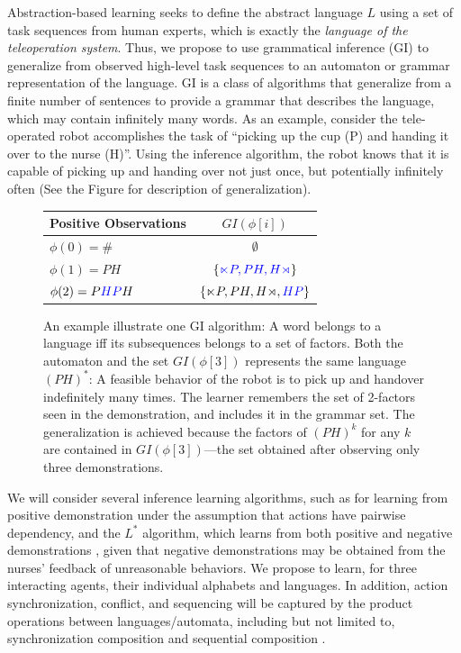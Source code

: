 \documentclass[letterpaper, 11 pt, onecolumn]{article}
\begin{document}
Abstraction-based learning seeks to define the abstract language $L$ using a set of task sequences from human experts, which is exactly the \emph{language of the teleoperation system}. Thus, we propose to use grammatical inference (GI) \cite{de2010grammatical} to generalize from observed  high-level task sequences to an automaton or grammar representation of the language. GI is a class of algorithms that generalize from a finite number of sentences to provide a grammar that describes the language, which may contain infinitely many words. As an example, consider the tele-operated robot accomplishes the task of ``picking up the cup (P) and handing it over to the nurse (H)''. Using the inference algorithm, the robot knows that it is capable of picking up and handing over not just once, but potentially infinitely often (See the Figure for description of generalization).
\begin{figure}
  \begin{center}

\end{center}
\begin{tabular}{ l c }
  \hline
  Positive Observations & $GI(\phi[i])$\\
  \hline
  $\phi(0)= \#$ & $\emptyset$ \\
  $\phi(1)= PH$ & $\{\textcolor{blue}{\ltimes
    P,PH,  H\rtimes}\}$ \\
  $\phi(2) = P\textcolor{blue}{HP}H$ & $\{\ltimes P, PH, H\rtimes, \textcolor{blue}{HP}\}$  \\
  \hline
\end{tabular}
  \caption{An example illustrate one GI algorithm: A word belongs to a language iff its subsequences belongs to a set of factors. Both the automaton and the set $GI(\phi[3])$ represents the same language $(PH)^\ast$: A feasible behavior of the robot is to pick up and handover indefinitely many times. The learner remembers the set of 2-factors seen in the demonstration, and includes it in the grammar set. The generalization is achieved because the factors of $(PH)^k$ for any $k$ are contained in $GI(\phi[3])$---the set obtained after observing only three demonstrations.}
\end{figure}
 We will consider several inference learning algorithms, such as \cite{heinz2013learning} for learning from positive demonstration under the assumption that actions have pairwise dependency, and the $L^\ast$ algorithm, which learns from both positive and negative demonstrations \cite{angluin1987learning}, given that negative demonstrations may be obtained from the nurses’ feedback of unreasonable behaviors. We propose to learn, for three interacting agents, their individual alphabets and languages. In addition, action synchronization, conflict, and sequencing will be captured by the  product operations between languages/automata, including but not limited to, synchronization composition and sequential composition \cite{alur2015principles,hopcroft2001introduction}. 
\end{document}
